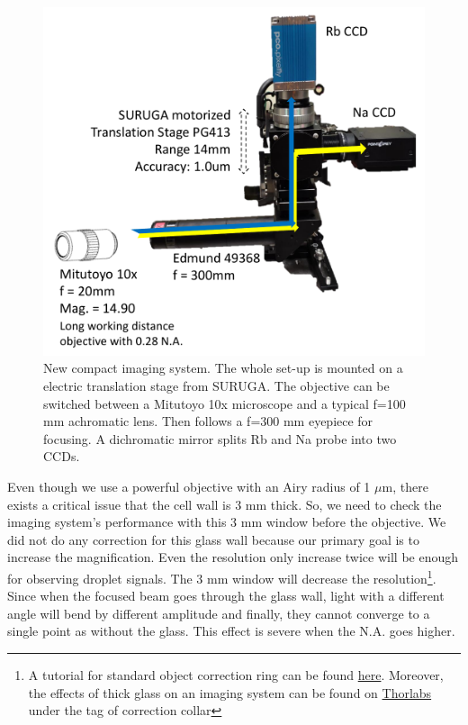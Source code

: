 \begin{figure}[htb]
\begin{center}
\includegraphics[width = 0.8\linewidth]{figures/image_system.pdf}
\end{center}
\caption[New compact imaging system]{New compact imaging system. The whole set-up is mounted on a electric translation stage from SURUGA. The objective can be switched between a Mitutoyo 10x microscope and a typical f=100 mm achromatic lens. Then follows a f=300 mm eyepiece for focusing. A dichromatic mirror splits Rb and Na probe into two CCDs.}
\label{image_system}
\end{figure}

Even though we use a powerful objective with an Airy radius of 1 $\mu$m, there exists a critical issue that the cell wall is 3 mm thick. So, we need to check the imaging system's performance with this 3 mm window before the objective. We did not do any correction for this glass wall because our primary goal is to increase the magnification. Even the resolution only increase twice will be enough for observing droplet signals. The 3 mm window will decrease the resolution\footnote{A tutorial for standard object correction ring can be found \href{ http://www.mvi-inc.com/wp-content/uploads/Use-of-the-Correction-Ring-on-the-Objective.pdf}{here}. Moreover, the effects of thick glass on an imaging system can be found on \href{https://www.thorlabs.com/newgrouppage9.cfm?objectgroup_id=9895&pn=TL2X-SAP}{Thorlabs} under the tag of correction collar}. Since when the focused beam goes through the glass wall, light with a different angle will bend by different amplitude and finally, they cannot converge to a single point as without the glass. This effect is severe when the N.A. goes higher.

